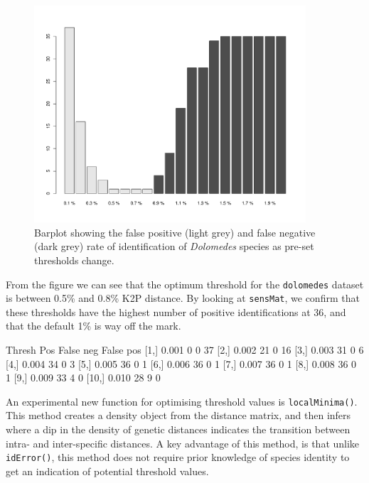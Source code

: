 \documentclass{article}
\newcommand{\fun}[1]{\texttt{#1}}
\begin{document}
\begin{figure}[p]
	\centering
	\includegraphics[width=0.9\textwidth,trim= 3cm 0cm 3cm 0cm]{sensitivity2}
	\caption{Barplot showing the false positive (light grey) and false negative (dark grey) rate of identification of \emph{Dolomedes} species as pre-set thresholds change.}
	\label{sensitivity.fig}
\end{figure}

From the figure we can see that the optimum threshold for the \fun{dolomedes} dataset is between 0.5\% and 0.8\% K2P distance. By looking at \fun{sensMat}, we confirm that these thresholds have the highest number of positive identifications at 36, and that the default 1\% is way off the mark.

\begin{Routput}
      Thresh Pos False neg False pos
 [1,]  0.001   0         0        37
 [2,]  0.002  21         0        16
 [3,]  0.003  31         0         6
 [4,]  0.004  34         0         3
 [5,]  0.005  36         0         1
 [6,]  0.006  36         0         1
 [7,]  0.007  36         0         1
 [8,]  0.008  36         0         1
 [9,]  0.009  33         4         0
[10,]  0.010  28         9         0
\end{Routput}

An experimental new function for optimising threshold values is \fun{localMinima()}. This method creates a density object from the distance matrix, and then infers where a dip in the density of genetic distances indicates the transition between intra- and inter-specific distances. A key advantage of this method, is that unlike \fun{idError()}, this method does not require prior knowledge of species identity to get an indication of potential threshold values.
\end{document}
